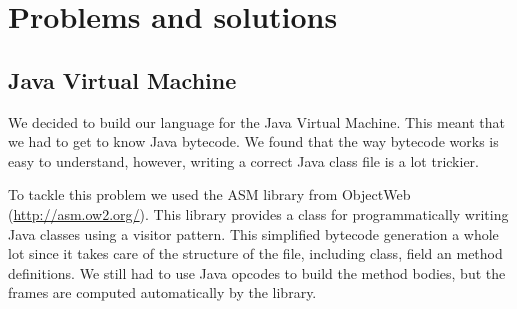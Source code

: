 \chapter{Problems and solutions}

\section{Java Virtual Machine}
\label{subj:asm}

We decided to build our language for the Java Virtual Machine.
This meant that we had to get to know Java bytecode.
We found that the way bytecode works is easy to understand, however, writing a correct Java class file is a lot trickier.

To tackle this problem we used the ASM library from ObjectWeb (\url{http://asm.ow2.org/}).
This library provides a class for programmatically writing Java classes using a visitor pattern.
This simplified bytecode generation a whole lot since it takes care of the structure of the file, including class, field an method definitions.
We still had to use Java opcodes to build the method bodies, but the frames are computed automatically by the library.

